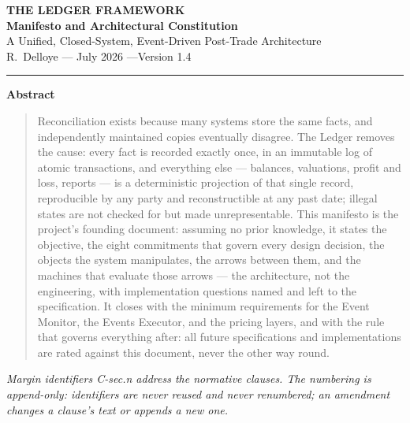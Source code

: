 \documentclass[11pt,a4paper]{article}
\begin{document}
\begin{center}
  {\LARGE\bfseries THE LEDGER FRAMEWORK}\\[0.9em]
  {\large\bfseries Manifesto and Architectural Constitution}\\[0.6em]
  {\normalsize A Unified, Closed-System, Event-Driven Post-Trade Architecture}\\[1.4em]
  R.~Delloye \quad--- July 2026 \quad---\quad Version 1.4
\end{center}

\vspace{0.6em}
\begin{center}\rule{0.35\linewidth}{0.4pt}\end{center}
\vspace{0.6em}

\begin{center}\textbf{Abstract}\end{center}
\begin{quote}
Reconciliation exists because many systems store the same facts, and
independently maintained copies eventually disagree. The Ledger removes
the cause: every fact is recorded exactly once, in an immutable log of
atomic transactions, and everything else --- balances, valuations,
profit and loss, reports --- is a deterministic projection of that
single record, reproducible by any party and reconstructible at any past
date; illegal states are not checked for but made unrepresentable. This
manifesto is the project's founding document: assuming no prior
knowledge, it states the objective, the eight commitments that govern every design
decision, the objects the system manipulates, the arrows
between them, and the machines that evaluate those arrows --- the
architecture, not the engineering, with implementation questions named
and left to the specification. It closes with the minimum requirements
for the Event Monitor, the Events Executor, and the pricing layers, and
with the rule that governs everything after: all future specifications
and implementations are rated against this document, never the other way
round.
\end{quote}

\begin{center}\small\itshape
Margin identifiers C-\emph{sec}.\emph{n} address the normative clauses.
The numbering is append-only: identifiers are never reused and never
renumbered; an amendment changes a clause's text or appends a new one.
\end{center}
\end{document}
